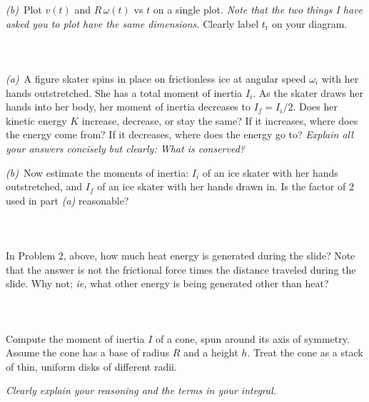 \documentclass[12pt]{article}
\newcounter{problem}
\begin{document}
\textsl{(b)}~Plot $v(t)$ and $R\,\omega(t)$ vs $t$ on a single plot.
\emph{Note that the two things I have asked you to plot have the same
dimensions.}  Clearly label $t_\mathrm{r}$ on your diagram.

\paragraph{\problemname~\theproblem}

\textsl{(a)}~A figure skater spins in place on frictionless ice at
angular speed $\omega_i$ with her hands outstretched.  She has a total
moment of inertia $I_i$.  As the skater draws her hands into her body,
her moment of inertia decreases to $I_f=I_i/2$.  Does her kinetic
energy $K$ increase, decrease, or stay the same?  If it increases,
where does the energy come from?  If it decreases, where does the
energy go to?  \emph{Explain all your answers concisely but clearly:
What is conserved?}

\textsl{(b)}~Now estimate the moments of inertia: $I_i$ of an ice
skater with her hands outstretched, and $I_f$ of an ice skater with
her hands drawn in.  Is the factor of 2 used in part \textsl{(a)}
reasonable?

\paragraph{\problemname~\theproblem}

In Problem 2, above, how much heat energy is generated during the
slide?  Note that the answer is not the frictional force times the
distance traveled during the slide.  Why not; \textit{ie,} what other
energy is being generated other than heat?

\paragraph{\problemname~\theproblem}

Compute the moment of inertia $I$ of a cone, spun around its axis of
symmetry.  Assume the cone has a base of radius $R$ and a height $h$.
Treat the cone as a stack of thin, uniform disks of different radii.

\emph{Clearly explain your reasoning and the terms in your integral.}

\paragraph{\problemname~\theproblem}
\end{document}
